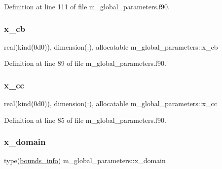 Definition at line 111 of file m\+\_\+global\+\_\+parameters.\+f90.

\mbox{\label{namespacem__global__parameters_abd9ada93ee5222de406111ee9c91ddf0}} 
\subsubsection{\texorpdfstring{x\+\_\+cb}{x\_cb}}
{\footnotesize\ttfamily real(kind(0d0)), dimension(\+:), allocatable m\+\_\+global\+\_\+parameters\+::x\+\_\+cb}



Definition at line 89 of file m\+\_\+global\+\_\+parameters.\+f90.

\mbox{\label{namespacem__global__parameters_aaf315f1df492ccc9daaeee046f185bb5}} 
\subsubsection{\texorpdfstring{x\+\_\+cc}{x\_cc}}
{\footnotesize\ttfamily real(kind(0d0)), dimension(\+:), allocatable m\+\_\+global\+\_\+parameters\+::x\+\_\+cc}



Definition at line 85 of file m\+\_\+global\+\_\+parameters.\+f90.

\mbox{\label{namespacem__global__parameters_a58e390acc41a75facd63f1d89a8e60bc}} 
\subsubsection{\texorpdfstring{x\+\_\+domain}{x\_domain}}
{\footnotesize\ttfamily type(\hyperlink{structm__derived__types_1_1bounds__info}{bounds\+\_\+info}) m\+\_\+global\+\_\+parameters\+::x\+\_\+domain}



